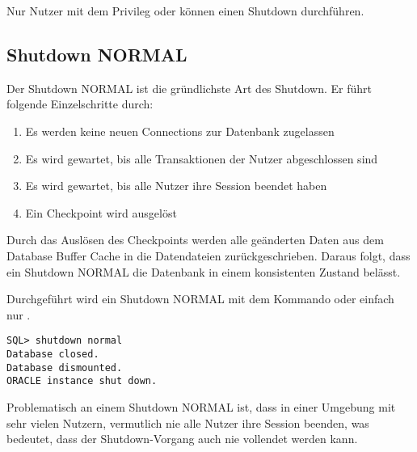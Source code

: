       \begin{merke}
        Nur Nutzer mit dem Privileg  oder  können einen Shutdown durchführen.
      \end{merke}
      \subsection{Shutdown NORMAL}
        Der Shutdown NORMAL ist die gründlichste Art des Shutdown. Er führt folgende Einzelschritte durch:
        \begin{enumerate}
          \item Es werden keine neuen Connections zur Datenbank zugelassen
          \item Es wird gewartet, bis alle Transaktionen der Nutzer abgeschlossen sind
          \item Es wird gewartet, bis alle Nutzer ihre Session beendet haben
          \item Ein Checkpoint wird ausgelöst
        \end{enumerate}
        Durch das Auslösen des Checkpoints werden alle geänderten Daten aus dem Database Buffer Cache in die Datendateien zurückgeschrieben. Daraus folgt, dass ein Shutdown NORMAL die Datenbank in einem konsistenten Zustand belässt.

        Durchgeführt wird ein Shutdown NORMAL mit dem Kommando
        oder einfach nur .
        \begin{lstlisting}[caption={Durchführen eines Shutdown
        NORMAL},label=admin08,language=sqlplus]
SQL> shutdown normal
Database closed.
Database dismounted.
ORACLE instance shut down.
        \end{lstlisting}
         \begin{merke}
           Problematisch an einem Shutdown NORMAL ist, dass in einer Umgebung mit sehr vielen Nutzern, vermutlich nie alle Nutzer ihre Session beenden, was bedeutet, dass der Shutdown-Vorgang auch nie vollendet werden kann.
         \end{merke}
\clearpage		 

